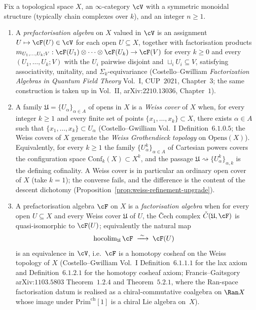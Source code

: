\begin{definition}
\label{def:prefact-weiss-fact}
Fix a topological space $X$, an $\infty$-category $\cV$ with a symmetric monoidal structure (typically chain complexes over $k$), and an integer $n \geq 1$.
\begin{enumerate}[label=\textup{(\roman*)}]
 \item A \emph{prefactorisation algebra} on $X$ valued in $\cV$ is an assignment $U \mapsto \cF(U) \in \cV$ for each open $U \subseteq X$, together with factorisation products $m_{U_1, \ldots, U_k; V} : \cF(U_1) \otimes \cdots \otimes \cF(U_k) \to \cF(V)$ for every $k \geq 0$ and every $(U_1, \ldots, U_k; V)$ with the $U_i$ pairwise disjoint and $\sqcup_i U_i \subseteq V$, satisfying associativity, unitality, and $\Sigma_k$-equivariance \textup{(}Costello--Gwilliam \emph{Factorization Algebras in Quantum Field Theory} Vol.~I, CUP~$2021$, Chapter~$3$; the same construction is taken up in Vol.~II, arXiv:$2210.13036$, Chapter~$1$\textup{).}
 \item A family $\mathfrak U = \{U_\alpha\}_{\alpha \in A}$ of opens in $X$ is a \emph{Weiss cover} of $X$ when, for every integer $k \geq 1$ and every finite set of points $\{x_1, \ldots, x_k\} \subset X$, there exists $\alpha \in A$ such that $\{x_1, \ldots, x_k\} \subset U_\alpha$ \textup{(}Costello--Gwilliam Vol.~I Definition~$6.1.0.5$; the Weiss covers of $X$ generate the \emph{Weiss Grothendieck topology} on $\mathrm{Opens}(X)$\textup{).} Equivalently, for every $k \geq 1$ the family $\{U_\alpha^k\}_{\alpha \in A}$ of Cartesian powers covers the configuration space $\mathrm{Conf}_k(X) \subset X^k$, and the passage $\mathfrak U \rightsquigarrow \{U_\alpha^k\}_{\alpha, k}$ is the defining cofinality. A Weiss cover is in particular an ordinary open cover of $X$ \textup{(}take $k = 1$\textup{);} the converse fails, and the difference is the content of the descent dichotomy \textup{(}Proposition~\ref{prop:weiss-refinement-upgrade}\textup{).}
 \item A prefactorisation algebra $\cF$ on $X$ is a \emph{factorisation algebra} when for every open $U \subseteq X$ and every Weiss cover $\mathfrak U$ of $U$, the Čech complex $\check{C}(\mathfrak U, \cF)$ is quasi-isomorphic to $\cF(U)$; equivalently the natural map
 \[
 \mathrm{hocolim}_{\mathfrak U}\, \cF \;\xrightarrow{\;\sim\;}\; \cF(U)
 \]
 is an equivalence in $\cV$, i.e.\ $\cF$ is a homotopy cosheaf on the Weiss topology of $X$ \textup{(}Costello--Gwilliam Vol.~I Definition~$6.1.1.1$ for the lax axiom and Definition~$6.1.2.1$ for the homotopy cosheaf axiom; Francis--Gaitsgory arXiv:$1103.5803$ Theorem~$1.2.4$ and Theorem~$5.2.1$, where the Ran-space factorisation datum is realised as a chiral-commutative coalgebra on $\Ran X$ whose image under $\mathrm{Prim}^{\mathrm{ch}}[1]$ is a chiral Lie algebra on~$X$\textup{).}
\end{enumerate}
\end{definition}

